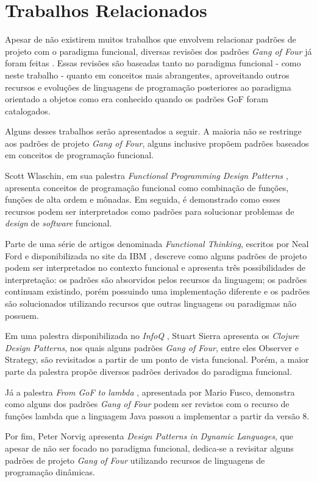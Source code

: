 \chapter{Trabalhos Relacionados}

Apesar de não existirem muitos trabalhos que envolvem
relacionar padrões de projeto com o paradigma funcional, 
diversas revisões dos padrões \textit{Gang of Four} 
já foram feitas 
\cite{nealford,peternorvig,scottwlaschin,stuartsierra,mariofusco}.
Essas revisões são baseadas tanto no paradigma 
funcional - como neste trabalho - quanto em  
conceitos mais abrangentes, aproveitando 
outros recursos e evoluções de linguagens de 
programação posteriores ao paradigma orientado a 
objetos como era conhecido quando os padrões GoF 
foram catalogados.

Alguns desses trabalhos serão apresentados a seguir.
A maioria não se restringe aos padrões de 
projeto \textit{Gang of Four}, alguns inclusive propõem 
padrões baseados em conceitos de programação funcional.

Scott Wlaschin, em sua palestra \textit{Functional Programming 
Design Patterns} \cite{scottwlaschin}, apresenta conceitos 
de programação funcional como combinação de funções, 
funções de alta ordem e mônadas. Em seguida, é 
demonstrado como esses recursos podem ser 
interpretados como padrões para solucionar problemas 
de \textit{design} de \textit{software} funcional.

Parte de uma série de artigos denominada \textit{Functional 
Thinking}, escritos por Neal Ford e disponibilizada 
no site da IBM \cite{nealford}, descreve como alguns padrões 
de projeto podem ser interpretados no contexto funcional e 
apresenta três possibilidades de interpretação: 
os padrões são absorvidos pelos recursos da 
linguagem; os padrões continuam existindo, porém possuindo 
uma implementação diferente e os padrões são solucionados 
utilizando recursos que outras linguagens ou 
paradigmas não possuem.

Em uma palestra disponibilizada no \textit{InfoQ} 
\cite{stuartsierra}, Stuart Sierra 
apresenta os \textit{Clojure Design Patterns}, nos quais 
alguns 
padrões \textit{Gang of Four}, entre eles Observer e 
Strategy, são revisitados a partir de um ponto de 
vista funcional. Porém, a maior parte da palestra propõe 
diversos padrões derivados do paradigma funcional.

Já a palestra \textit{From GoF to lambda} \cite{mariofusco}, 
apresentada por Mario Fusco, demonstra como alguns 
dos padrões \textit{Gang of Four} podem ser revistos 
com o recurso de funções lambda que a linguagem Java 
passou a implementar a partir da versão 8.

Por fim, Peter Norvig apresenta \textit{Design Patterns in 
Dynamic Languages}\cite{peternorvig}, que apesar de não ser 
focado no paradigma funcional, dedica-se a revisitar alguns 
padrões de projeto \textit{Gang of Four} utilizando recursos 
de linguagens de programação dinâmicas. 
